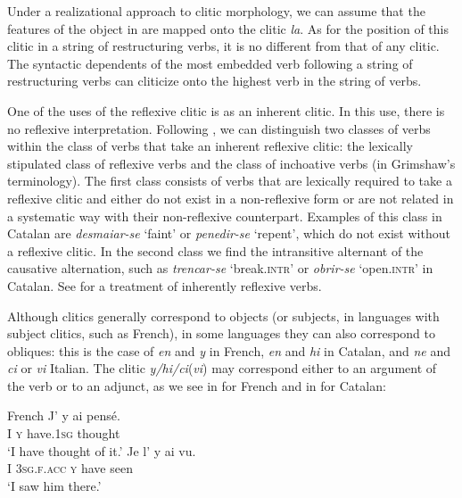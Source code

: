 \documentclass[output=paper,hidelinks]{langscibook}
\begin{document}
Under a realizational approach to clitic morphology, we can assume that the features of the object in  are mapped onto the clitic \textit{la}. As for the position of this clitic in a string of restructuring verbs, it is no different from that of any clitic. The syntactic dependents of the most embedded verb following a string of restructuring verbs can cliticize onto the highest verb in the string of verbs.

One of the uses of the reflexive clitic is as an inherent clitic. In this use, there is no reflexive interpretation. Following \citet{Grimshaw1982}, we can distinguish two classes of verbs within the class of verbs that take an inherent reflexive clitic: the lexically stipulated class of reflexive verbs and the class of inchoative verbs (in Grimshaw's terminology). The first class consists of verbs that are lexically required to take a reflexive clitic and either do not exist in a non-reflexive form or are not related in a systematic way with their non-reflexive counterpart. Examples of this class in Catalan are \textit{desmaiar-se} `faint' or \textit{penedir-se} `repent', which do not exist without a reflexive clitic. In the second class we find the intransitive alternant of the causative alternation, such as \textit{trencar-se} `break.\textsc{intr'} or \textit{obrir-se} `open.\textsc{intr'} in Catalan. See \citet{Alsina2020} for a treatment of inherently reflexive verbs.

\label{sec:Romance:2.2.3.2}

Although clitics generally correspond to objects (or subjects, in languages with subject clitics, such as French), in some languages they can also correspond to obliques: this is the case of \textit{en} and \textit{y} in French, \textit{en} and \textit{hi} in Catalan, and \textit{ne} and \textit{ci} or \textit{vi} Italian. The clitic \textit{y/hi/ci}(\textit{vi}) may correspond either to an argument of the verb or to an adjunct, as we see in  for French and in  for Catalan:

\ea\label{ex:Romance:18} French \citep{Schwarze2001}
\ea\label{ex:Romance:18a}
\gll
J' y ai pensé.\\
I \textsc{y} have.\textsc{1sg} thought\\
\glt   `I have thought of it.'
\ex\label{ex:Romance:18b}
\gll
Je l' y ai vu.\\
I \textsc{3sg.f.acc} \textsc{y} have seen\\
\glt   `I saw him there.'    
\z\z
\end{document}
